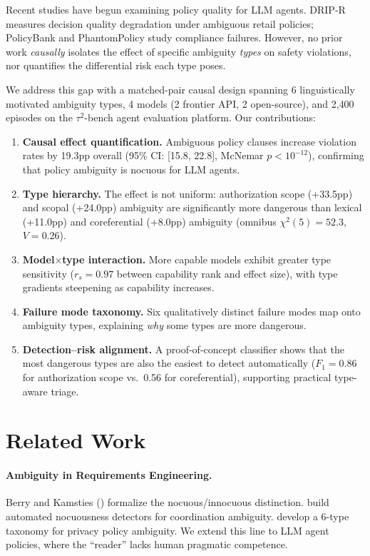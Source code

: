 \documentclass[11pt,a4paper]{article}
\begin{document}
Recent studies have begun examining policy quality for LLM agents. DRIP-R \cite{liu2024dripr} measures decision quality degradation under ambiguous retail policies; PolicyBank \cite{chen2024policybank} and PhantomPolicy \cite{zheng2024phantompolicy} study compliance failures. However, no prior work \emph{causally} isolates the effect of specific ambiguity \emph{types} on safety violations, nor quantifies the differential risk each type poses.

We address this gap with a matched-pair causal design spanning 6 linguistically motivated ambiguity types, 4 models (2 frontier API, 2 open-source), and 2{,}400 episodes on the $\tau^2$-bench agent evaluation platform. Our contributions:

\begin{enumerate}[nosep,leftmargin=*]
\item \textbf{Causal effect quantification.} Ambiguous policy clauses increase violation rates by 19.3pp overall (95\% CI: [15.8, 22.8], McNemar $p < 10^{-12}$), confirming that policy ambiguity is nocuous for LLM agents.
\item \textbf{Type hierarchy.} The effect is not uniform: authorization scope (+33.5pp) and scopal (+24.0pp) ambiguity are significantly more dangerous than lexical (+11.0pp) and coreferential (+8.0pp) ambiguity (omnibus $\chi^2(5) = 52.3$, $V = 0.26$).
\item \textbf{Model$\times$type interaction.} More capable models exhibit greater type sensitivity ($r_s = 0.97$ between capability rank and effect size), with type gradients steepening as capability increases.
\item \textbf{Failure mode taxonomy.} Six qualitatively distinct failure modes map onto ambiguity types, explaining \emph{why} some types are more dangerous.
\item \textbf{Detection--risk alignment.} A proof-of-concept classifier shows that the most dangerous types are also the easiest to detect automatically ($F_1 = 0.86$ for authorization scope vs.\ 0.56 for coreferential), supporting practical type-aware triage.
\end{enumerate}

\section{Related Work}

\paragraph{Ambiguity in Requirements Engineering.}
Berry and Kamsties (\citeyear{berry2003ambiguity}) formalize the nocuous/innocuous distinction. \citet{chantree2006identifying} build automated nocuousness detectors for coordination ambiguity. \citet{massey2014evaluating} develop a 6-type taxonomy for privacy policy ambiguity. We extend this line to LLM agent policies, where the ``reader'' lacks human pragmatic competence.
\end{document}
